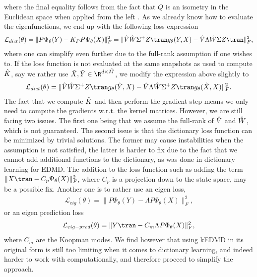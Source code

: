 \documentclass{article}
\begin{document}
where the final equality follows from the fact that \(Q\) is an isometry in the Euclidean space when applied from the left \citep{abadir-2005}. As we already know how to evaluate the eigenfunctions, we end up with the following loss expression
\begin{align*}
    \mathcal{L}_{dict}(\theta) = \lVert P\Psi_{\theta}(Y) - K_P P\Psi_{\theta}(X) \rVert_F^2 = \lVert \Hat V \Hat W \Sigma^+ Z\tran g_{\theta}(Y,X) - \Hat V \Lambda \Hat W \Sigma Z\tran\rVert_F^2,
\end{align*}
where one can simplify even further due to the full-rank assumption if one wishes to. If the loss function is not evaluated at the same snapshots as used to compute \(\Hat K\), say we rather use \(\Tilde X, \Tilde Y \in \R^{ d\times \Tilde M}\), we modify the expression above slightly to 
\begin{align*}
    \mathcal{L}_{dict}(\theta) = \lVert \Hat V \Hat W \Sigma^+ Z\tran g_{\theta}(\Tilde Y,X) - \Hat V \Lambda \Hat W \Sigma^+ Z\tran g_{\theta}(\Tilde X, X)\rVert_F^2.
\end{align*}
The fact that we compute \(\Hat K\) and then perform the gradient step means we only need to compute the gradients w.r.t. the kernel matrices. However, we are still facing two issues. The first one being that we  assume the full-rank of \(\Hat V\) and \(\Hat W\), which is not guaranteed. The second issue is that the dictionary loss function can be minimized by trivial solutions. The former may cause instabilities when the assumption is not satisfied, the latter is harder to fix due to the fact that we cannot add additional functions to the dictionary, as was done in dictionary learning for EDMD. The addition to the loss function such as adding the term \(\lVert X\tran - C_p\Psi_{\theta}(X)\rVert_F^2\), where \(C_p\) is a projection down to the state space, may be a possible fix. Another one is to rather use an eigen loss,
\begin{align}\label{eq:kedmd_eigloss}
    \mathcal{L}_{eig}(\theta) = \lVert P\Phi_{\theta}(Y) - \Lambda P\Phi_{\theta}(X)\rVert_F^2,
\end{align}
or an eigen prediction loss 
\begin{align}\label{eq:kedmd_eigpredloss}
    \mathcal{L}_{eig-pred}(\theta) = \lVert Y\tran - C_m\Lambda P\Phi_{\theta}(X)\rVert_F^2,
\end{align}
where \(C_m\) are the Koopman modes. We find however that using kEDMD in its original form is still too limiting when it comes to dictionary learning, and indeed harder to work with computationally, and therefore proceed to simplify the approach.
\end{document}
